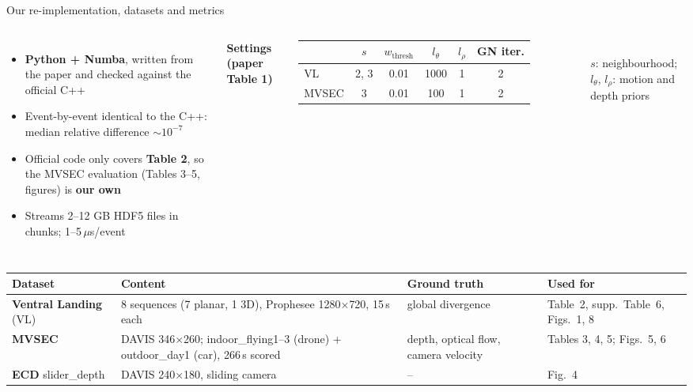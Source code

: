 \documentclass[aspectratio=169,10pt]{beamer}
\newcommand{\us}{\,$\mu$s}
\renewcommand{\arraystretch}{1.12}
\begin{document}
\begin{frame}{Our re-implementation, datasets and metrics}
  \begin{columns}[T,onlytextwidth]
    \begin{itemize}\footnotesize\setlength{\itemsep}{0pt}
      \item \textbf{Python + Numba}, written from the paper and checked against the official C++
      \item \alert{Event-by-event identical} to the C++: median relative difference $\sim 10^{-7}$
      \item Official code only covers \textbf{Table 2}, so the \alert{MVSEC evaluation} (Tables 3--5, figures) is \textbf{our own}
      \item Streams 2--12 GB HDF5 files in chunks; 1--5\us/event
    \end{itemize}
    {\footnotesize\color{titlebar}\bfseries Settings (paper Table 1)}\par\vspace{0.5mm}
    \footnotesize\setlength{\tabcolsep}{4pt}\renewcommand{\arraystretch}{1.0}
    \begin{tabular}{@{}l c c c c c@{}}
      \toprule
      & $s$ & $w_\text{thresh}$ & $l_\theta$ & $l_\rho$ & GN iter. \\
      \midrule
      VL    & 2, 3 & 0.01 & 1000 & 1 & 2 \\
      MVSEC & 3    & 0.01 & 100  & 1 & 2 \\
      \bottomrule
    \end{tabular}\\[0.5mm]
    {\scriptsize $s$: neighbourhood; $l_\theta$, $l_\rho$: motion and depth priors}
  \end{columns}

  \vspace{0.5mm}
  \footnotesize\renewcommand{\arraystretch}{1.0}
  \begin{tabular}{@{}L{2.7cm}L{5.4cm}L{2.4cm}L{2.5cm}@{}}
    \toprule
    Dataset & Content & Ground truth & Used for \\
    \midrule
    \textbf{Ventral Landing} (VL) & 8 sequences (7 planar, 1 3D), Prophesee 1280$\times$720, 15\,s each & global divergence & Table~2, supp.\ Table~6, Figs.~1, 8 \\
    \textbf{MVSEC} & DAVIS 346$\times$260; indoor\_flying1--3 (drone) + outdoor\_day1 (car), 266\,s scored & depth, optical flow, camera velocity & Tables 3, 4, 5; Figs.~5, 6 \\
    \textbf{ECD} slider\_depth & DAVIS 240$\times$180, sliding camera & -- & Fig.~4 \\
    \bottomrule
  \end{tabular}


\end{frame}
\end{document}
